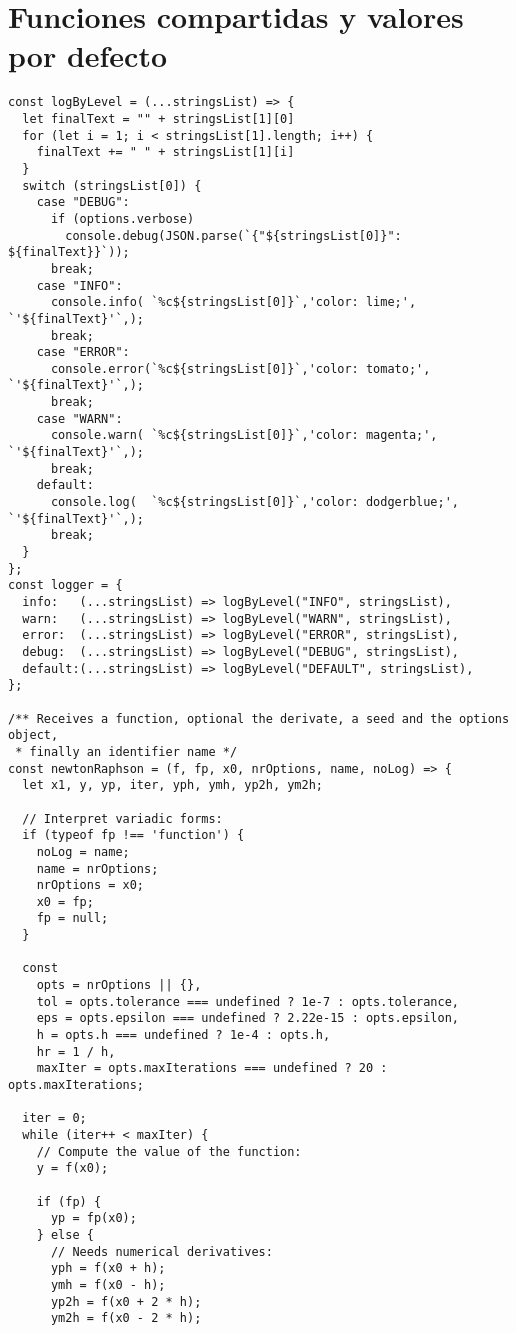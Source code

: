 \section{Funciones compartidas y valores por defecto}
\begin{verbatim}
const logByLevel = (...stringsList) => {
  let finalText = "" + stringsList[1][0]
  for (let i = 1; i < stringsList[1].length; i++) {
    finalText += " " + stringsList[1][i]
  }
  switch (stringsList[0]) {
    case "DEBUG":
      if (options.verbose) 
        console.debug(JSON.parse(`{"${stringsList[0]}": ${finalText}}`));
      break;
    case "INFO": 
      console.info( `%c${stringsList[0]}`,'color: lime;', `'${finalText}'`,);
      break;
    case "ERROR":
      console.error(`%c${stringsList[0]}`,'color: tomato;', `'${finalText}'`,);
      break;
    case "WARN":
      console.warn( `%c${stringsList[0]}`,'color: magenta;', `'${finalText}'`,);
      break;
    default:
      console.log(  `%c${stringsList[0]}`,'color: dodgerblue;', `'${finalText}'`,);
      break;
  }
};
const logger = {
  info:   (...stringsList) => logByLevel("INFO", stringsList),
  warn:   (...stringsList) => logByLevel("WARN", stringsList),
  error:  (...stringsList) => logByLevel("ERROR", stringsList),
  debug:  (...stringsList) => logByLevel("DEBUG", stringsList),
  default:(...stringsList) => logByLevel("DEFAULT", stringsList),
};

/** Receives a function, optional the derivate, a seed and the options object, 
 * finally an identifier name */
const newtonRaphson = (f, fp, x0, nrOptions, name, noLog) => {
  let x1, y, yp, iter, yph, ymh, yp2h, ym2h;

  // Interpret variadic forms:
  if (typeof fp !== 'function') {
    noLog = name;
    name = nrOptions;
    nrOptions = x0;
    x0 = fp;
    fp = null;
  }

  const 
    opts = nrOptions || {},
    tol = opts.tolerance === undefined ? 1e-7 : opts.tolerance,
    eps = opts.epsilon === undefined ? 2.22e-15 : opts.epsilon,
    h = opts.h === undefined ? 1e-4 : opts.h,
    hr = 1 / h,
    maxIter = opts.maxIterations === undefined ? 20 : opts.maxIterations;

  iter = 0;
  while (iter++ < maxIter) {
    // Compute the value of the function:
    y = f(x0);

    if (fp) {
      yp = fp(x0);
    } else {
      // Needs numerical derivatives:
      yph = f(x0 + h);
      ymh = f(x0 - h);
      yp2h = f(x0 + 2 * h);
      ym2h = f(x0 - 2 * h);


\end{verbatim}
